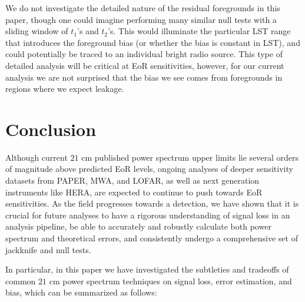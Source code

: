 \documentclass[preprint2,numberedappendix,tighten]{aastex6}  %
\begin{document}
We do not investigate the detailed nature of the residual foregrounds in this paper, though one could imagine performing many 
similar null tests with a sliding window of $t_{1}$'s and $t_{2}$'s. This would illuminate the particular LST range that introduces 
the foreground bias (or whether the bias is constant in LST), and could potentially be traced to an individual bright radio source. 
This type of detailed analysis will be critical at EoR sensitivities, however, for our current analysis we are not surprised that the 
bias we see comes from foregrounds in regions where we expect leakage.


\section{Conclusion}
\label{sec:Con}

Although current $21$ cm published power spectrum upper limits lie several orders of magnitude above predicted EoR levels, 
ongoing analyses of deeper sensitivity datasets from PAPER, MWA, and LOFAR, as well as next generation instruments like 
HERA, are expected to continue to push towards EoR sensitivities. As the field progresses towards a detection, we have shown 
that it is crucial for future analyses to have a rigorous understanding of signal loss in an analysis pipeline, be able to accurately 
and robustly calculate both power spectrum and theoretical errors, and consistently undergo a comprehensive set of jackknife 
and null tests.

In particular, in this paper we have investigated the subtleties and tradeoffs of common $21$ cm power spectrum techniques on 
signal loss, error estimation, and bias, which can be summarized as follows:
\end{document}
